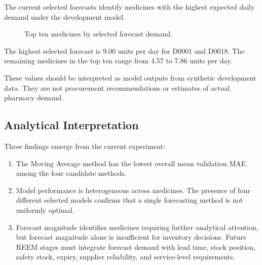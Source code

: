 \documentclass[11pt,a4paper]{article}
\begin{document}
The current selected forecasts identify medicines with the highest expected
daily demand under the development model.

\begin{figure}[H]
\centering
{}
\caption{Top ten medicines by selected forecast demand.}
\label{fig:top-demand}
\end{figure}

The highest selected forecast is 9.00 units per day for D0001 and D0018.
The remaining medicines in the top ten range from 4.57 to 7.86 units per
day.

These values should be interpreted as model outputs from synthetic
development data. They are not procurement recommendations or estimates of
actual pharmacy demand.

\subsection{Analytical Interpretation}

Three findings emerge from the current experiment:

\begin{enumerate}
    \item The Moving Average method has the lowest overall mean validation
    MAE among the four candidate methods.

    \item Model performance is heterogeneous across medicines. The presence
    of four different selected models confirms that a single forecasting
    method is not uniformly optimal.

    \item Forecast magnitude identifies medicines requiring further
    analytical attention, but forecast magnitude alone is insufficient for
    inventory decisions. Future REEM stages must integrate forecast demand
    with lead time, stock position, safety stock, expiry, supplier
    reliability, and service-level requirements.
\end{enumerate}
\end{document}
